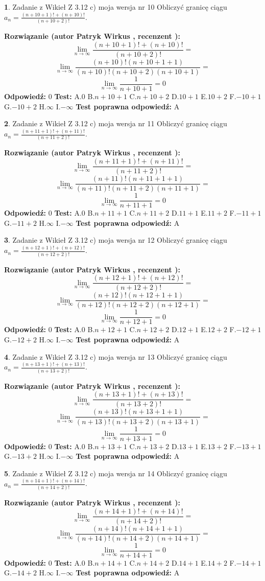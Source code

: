 \documentclass[12pt, a4paper]{article}
\theoremstyle{definition} %
\newtheorem{zad}{}
\newcommand{\zadStart}[1]{\begin{zad}#1\newline}
\newcommand{\zadStop}{\end{zad}}
\newcommand{\rozwStart}[2]{\noindent \textbf{Rozwiązanie (autor #1 , recenzent #2): }\newline}
\newcommand{\rozwStop}{\newline}
\newcommand{\odpStart}{\noindent \textbf{Odpowiedź:}\newline}
\newcommand{\odpStop}{\newline}
\newcommand{\testStart}{\noindent \textbf{Test:}\newline}
\newcommand{\testStop}{\newline}
\newcommand{\kluczStart}{\noindent \textbf{Test poprawna odpowiedź:}\newline}
\newcommand{\kluczStop}{\newline}
\begin{document}
\zadStart{Zadanie z Wikieł Z 3.12 c) moja wersja nr 10}
Obliczyć granicę ciągu $a_{n}=\frac{(n+10+1)!+(n+10)!}{(n+10+2)!}$.
\zadStop
\rozwStart{Patryk Wirkus}{}
$$\lim\limits_{n\to\infty}\frac{(n+10+1)!+(n+10)!}{(n+10+2)!}=$$
$$\lim\limits_{n\to\infty}\frac{(n+10)!(n+10+1+1)}{(n+10)!(n+10+2)(n+10+1)}=$$
$$\lim\limits_{n\to\infty}\frac{1}{n+10+1}= 0$$
\rozwStop
\odpStart
$0$
\odpStop
\testStart
A.$0$
B.$n+10+1$
C.$n+10+2$
D.$10+1$
E.$10+2$
F.$-10+1$
G.$-10+2$
H.$\infty$
I.$-\infty$
\testStop
\kluczStart
A
\kluczStop



\zadStart{Zadanie z Wikieł Z 3.12 c) moja wersja nr 11}
Obliczyć granicę ciągu $a_{n}=\frac{(n+11+1)!+(n+11)!}{(n+11+2)!}$.
\zadStop
\rozwStart{Patryk Wirkus}{}
$$\lim\limits_{n\to\infty}\frac{(n+11+1)!+(n+11)!}{(n+11+2)!}=$$
$$\lim\limits_{n\to\infty}\frac{(n+11)!(n+11+1+1)}{(n+11)!(n+11+2)(n+11+1)}=$$
$$\lim\limits_{n\to\infty}\frac{1}{n+11+1}= 0$$
\rozwStop
\odpStart
$0$
\odpStop
\testStart
A.$0$
B.$n+11+1$
C.$n+11+2$
D.$11+1$
E.$11+2$
F.$-11+1$
G.$-11+2$
H.$\infty$
I.$-\infty$
\testStop
\kluczStart
A
\kluczStop



\zadStart{Zadanie z Wikieł Z 3.12 c) moja wersja nr 12}
Obliczyć granicę ciągu $a_{n}=\frac{(n+12+1)!+(n+12)!}{(n+12+2)!}$.
\zadStop
\rozwStart{Patryk Wirkus}{}
$$\lim\limits_{n\to\infty}\frac{(n+12+1)!+(n+12)!}{(n+12+2)!}=$$
$$\lim\limits_{n\to\infty}\frac{(n+12)!(n+12+1+1)}{(n+12)!(n+12+2)(n+12+1)}=$$
$$\lim\limits_{n\to\infty}\frac{1}{n+12+1}= 0$$
\rozwStop
\odpStart
$0$
\odpStop
\testStart
A.$0$
B.$n+12+1$
C.$n+12+2$
D.$12+1$
E.$12+2$
F.$-12+1$
G.$-12+2$
H.$\infty$
I.$-\infty$
\testStop
\kluczStart
A
\kluczStop



\zadStart{Zadanie z Wikieł Z 3.12 c) moja wersja nr 13}
Obliczyć granicę ciągu $a_{n}=\frac{(n+13+1)!+(n+13)!}{(n+13+2)!}$.
\zadStop
\rozwStart{Patryk Wirkus}{}
$$\lim\limits_{n\to\infty}\frac{(n+13+1)!+(n+13)!}{(n+13+2)!}=$$
$$\lim\limits_{n\to\infty}\frac{(n+13)!(n+13+1+1)}{(n+13)!(n+13+2)(n+13+1)}=$$
$$\lim\limits_{n\to\infty}\frac{1}{n+13+1}= 0$$
\rozwStop
\odpStart
$0$
\odpStop
\testStart
A.$0$
B.$n+13+1$
C.$n+13+2$
D.$13+1$
E.$13+2$
F.$-13+1$
G.$-13+2$
H.$\infty$
I.$-\infty$
\testStop
\kluczStart
A
\kluczStop



\zadStart{Zadanie z Wikieł Z 3.12 c) moja wersja nr 14}
Obliczyć granicę ciągu $a_{n}=\frac{(n+14+1)!+(n+14)!}{(n+14+2)!}$.
\zadStop
\rozwStart{Patryk Wirkus}{}
$$\lim\limits_{n\to\infty}\frac{(n+14+1)!+(n+14)!}{(n+14+2)!}=$$
$$\lim\limits_{n\to\infty}\frac{(n+14)!(n+14+1+1)}{(n+14)!(n+14+2)(n+14+1)}=$$
$$\lim\limits_{n\to\infty}\frac{1}{n+14+1}= 0$$
\rozwStop
\odpStart
$0$
\odpStop
\testStart
A.$0$
B.$n+14+1$
C.$n+14+2$
D.$14+1$
E.$14+2$
F.$-14+1$
G.$-14+2$
H.$\infty$
I.$-\infty$
\testStop
\kluczStart
A
\kluczStop
\end{document}
